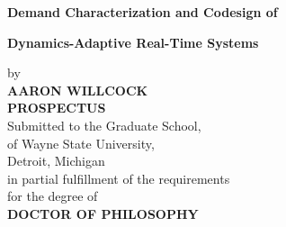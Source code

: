 \centerline{\bf Demand Characterization and Codesign of }
\vspace{-0.4cm}
\centerline{\bf Dynamics-Adaptive Real-Time Systems}

\vskip-0.4cm

\thispagestyle{empty}

\begin{center}
    \vspace{-0.4cm}
    by \\
    {\bf AARON WILLCOCK}\\ %
    {\bf PROSPECTUS}\\  %
    Submitted to the Graduate School,\\
    of Wayne State University,\\
    Detroit, Michigan\\
    in partial fulfillment of the requirements\\
    for the degree of\\
    {\bf DOCTOR OF PHILOSOPHY} %
\end{center}

